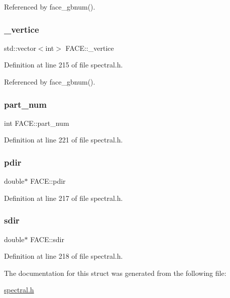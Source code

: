 Referenced by face\+\_\+gbnum().

\mbox{\label{structFACE_a70d99e98683b8ecddb3cd8ba22f747f3}} 
\subsubsection{\texorpdfstring{\+\_\+vertice}{\_vertice}}
{\footnotesize\ttfamily std\+::vector$<$int$>$ F\+A\+C\+E\+::\+\_\+vertice}



Definition at line 215 of file spectral.\+h.



Referenced by face\+\_\+gbnum().

\mbox{\label{structFACE_a2f3e5298e014da1f7bbc8e61a9301ef8}} 
\subsubsection{\texorpdfstring{part\+\_\+num}{part\_num}}
{\footnotesize\ttfamily int F\+A\+C\+E\+::part\+\_\+num}



Definition at line 221 of file spectral.\+h.

\mbox{\label{structFACE_a6ef1293fa7979984be6e8a27126a4e83}} 
\subsubsection{\texorpdfstring{pdir}{pdir}}
{\footnotesize\ttfamily double$\ast$ F\+A\+C\+E\+::pdir}



Definition at line 217 of file spectral.\+h.

\mbox{\label{structFACE_a1ce0e6eb1b664281eec931c0adb2f314}} 
\subsubsection{\texorpdfstring{sdir}{sdir}}
{\footnotesize\ttfamily double$\ast$ F\+A\+C\+E\+::sdir}



Definition at line 218 of file spectral.\+h.



The documentation for this struct was generated from the following file\+:\begin{DoxyCompactItemize}
\item 
\hyperlink{spectral_8h}{spectral.\+h}\end{DoxyCompactItemize}
